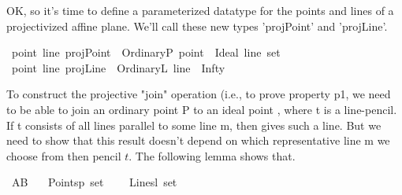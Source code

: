 \begin{isabellebody}
\isamarkuptrue%
%
\begin{isamarkuptext}%
OK, so it's time to define a parameterized datatype for the points and lines of a 
projectivized affine plane. We'll call these new types 'projPoint' and 'projLine'.%
\end{isamarkuptext}\isamarkuptrue%
\isamarkupfalse%
\ {\isacharparenleft}{\kern0pt}{\isacharprime}{\kern0pt}point{\isacharcomma}{\kern0pt}\ {\isacharprime}{\kern0pt}line{\isacharparenright}{\kern0pt}\ projPoint\ {\isacharequal}{\kern0pt}\ OrdinaryP\ {\isacharprime}{\kern0pt}point\ {\isacharbar}{\kern0pt}\ Ideal\ {\isachardoublequoteopen}{\isacharprime}{\kern0pt}line\ set{\isachardoublequoteclose}\isanewline
{}\isamarkupfalse%
\ {\isacharparenleft}{\kern0pt}{\isacharprime}{\kern0pt}point{\isacharcomma}{\kern0pt}\ {\isacharprime}{\kern0pt}line{\isacharparenright}{\kern0pt}\ projLine\ {\isacharequal}{\kern0pt}\ OrdinaryL\ {\isacharprime}{\kern0pt}line\ {\isacharbar}{\kern0pt}\ Infty%
\begin{isamarkuptext}%
To construct the projective "join" operation (i.e., to prove property p1, 
we need to be able to join an ordinary point
P to an ideal point , where t is a line-pencil. If t consists of all lines parallel to
some line m, then  gives such a line. But we need to show that this result 
doesn't depend on which representative line m we choose from then pencil $t$. The following 
lemma shows that.%
\end{isamarkuptext}\isamarkuptrue%
\isamarkupfalse%
\ AB{\isacharcolon}{\kern0pt}\isanewline
\ \ \ Points{\isacharcolon}{\kern0pt}{\isacharcolon}{\kern0pt}{\isachardoublequoteopen}{\isacharprime}{\kern0pt}p\ set{\isachardoublequoteclose}\ \isanewline
\ \ \ Lines{\isacharcolon}{\kern0pt}{\isacharcolon}{\kern0pt}{\isachardoublequoteopen}{\isacharprime}{\kern0pt}l\ set{\isachardoublequoteclose}\isanewline

\end{isabellebody}
